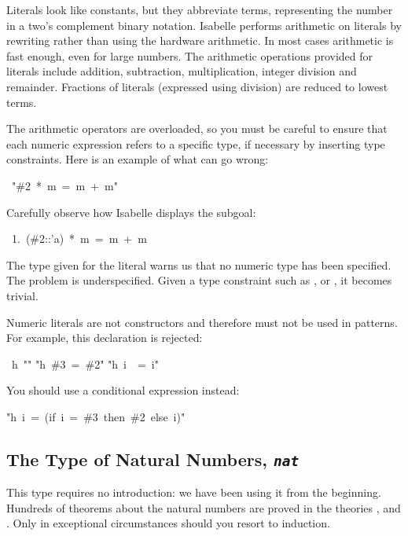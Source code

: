 Literals look like constants, but they abbreviate 
terms, representing the number in a two's complement binary notation. 
Isabelle performs arithmetic on literals by rewriting rather 
than using the hardware arithmetic. In most cases arithmetic 
is fast enough, even for large numbers. The arithmetic operations 
provided for literals include addition, subtraction, multiplication, 
integer division and remainder.  Fractions of literals (expressed using
division) are reduced to lowest terms.

\begin{warn}
The arithmetic operators are 
overloaded, so you must be careful to ensure that each numeric 
expression refers to a specific type, if necessary by inserting 
type constraints.  Here is an example of what can go wrong:
\par
\begin{isabelle}
\ "\#2\ *\ m\ =\ m\ +\ m"
\end{isabelle}
%
Carefully observe how Isabelle displays the subgoal:
\begin{isabelle}
\ 1.\ (\#2::'a)\ *\ m\ =\ m\ +\ m
\end{isabelle}
The type  given for the literal  warns us that no numeric
type has been specified.  The problem is underspecified.  Given a type
constraint such as ,  or , it becomes trivial.
\end{warn}

\begin{warn}
Numeric literals are not constructors and therefore must not be used in
patterns.  For example, this declaration is rejected:
\begin{isabelle}
\ h\ "\isacharbraceleft \isacharbraceright "\isanewline
"h\ \#3\ =\ \#2"\isanewline
"h\ i\ \ =\ i"
\end{isabelle}

You should use a conditional expression instead:
\begin{isabelle}
"h\ i\ =\ (if\ i\ =\ \#3\ then\ \#2\ else\ i)"
\end{isabelle}
\end{warn}



\subsection{The Type of Natural Numbers, {\tt\slshape nat}}

This type requires no introduction: we have been using it from the
beginning.  Hundreds of theorems about the natural numbers are
proved in the theories ,  and .  Only
in exceptional circumstances should you resort to induction.

